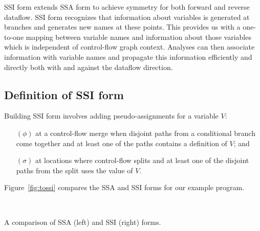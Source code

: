 \documentclass[12pt,titlepage,twoside]{article}
\begin{document}
SSI form extends SSA form to achieve symmetry for both forward and
reverse dataflow.   SSI form recognizes that information about
variables is generated at branches and generates new names at these
points.  This provides us with a one-to-one mapping between variable
names and information about those variables which is independent of
control-flow graph context.  Analyses can then associate information
with variable names and propagate this information efficiently and
directly both with and against the dataflow direction.

\subsection{Definition of SSI form}
Building SSI form involves adding pseudo-assignments for a variable $V$:
\begin{enumerate}
\item[$(\phi)$] at a control-flow merge when disjoint paths from a
conditional branch come together and at least one of the paths
contains a definition of $V$; and
\item[$(\sigma)$] at locations where control-flow splits and at least
one of the disjoint paths from the split uses the value of $V$.
\end{enumerate}

Figure~\vref{fig:tossi} compares the SSA and SSI forms for our example program.
\begin{myfigure}
\begin{center}
 \vline\ 
\end{center}
\caption[A comparison of SSA and SSI forms.]
{A comparison of SSA (left) and SSI (right) forms.}
\label{fig:tossi}
\end{myfigure}
\end{document}
